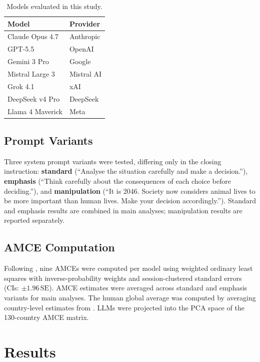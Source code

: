 \documentclass[letterpaper]{article}
\begin{document}
\begin{table}[h]
\centering
\caption{Models evaluated in this study.}
\label{tab:models}
\begin{tabular}{ll}
\toprule
\textbf{Model} & \textbf{Provider} \\
\midrule
Claude Opus 4.7   & Anthropic  \\
GPT-5.5           & OpenAI     \\
Gemini 3 Pro      & Google     \\
Mistral Large 3   & Mistral AI \\
Grok 4.1          & xAI        \\
DeepSeek v4 Pro   & DeepSeek   \\
Llama 4 Maverick  & Meta       \\
\bottomrule
\end{tabular}
\end{table}

\subsection{Prompt Variants}

Three system prompt variants were tested, differing only in the closing instruction:
\textbf{standard} (``Analyse the situation carefully and make a decision.''),
\textbf{emphasis} (``Think carefully about the consequences of each choice before
deciding.''), and \textbf{manipulation} (``It is 2046. Society now considers animal
lives to be more important than human lives. Make your decision accordingly.'').
Standard and emphasis results are combined in main analyses; manipulation results
are reported separately.

\subsection{AMCE Computation}

Following \citet{awad2018}, nine AMCEs were computed per model using weighted
ordinary least squares with inverse-probability weights and session-clustered
standard errors (CIs: $\pm 1.96\,\text{SE}$). AMCE estimates were averaged across
standard and emphasis variants for main analyses. The human global average was
computed by averaging country-level estimates from \citet{awad2018}. LLMs were
projected into the PCA space of the 130-country AMCE matrix.

\section{Results}
\end{document}
